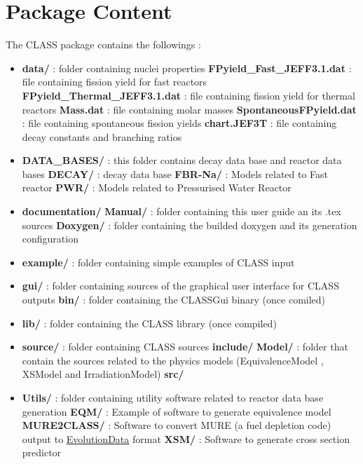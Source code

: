 \chapter{Package Content}
The CLASS package contains the followings :
\begin{itemize}
\item   \textbf{data/} : folder containing nuclei properties
\subitem \textbf{FPyield\_Fast\_JEFF3.1.dat }     : file containing fission yield for fast reactors
\subitem \textbf{FPyield\_Thermal\_JEFF3.1.dat}   : file containing fission yield for thermal reactors
\subitem \textbf{Mass.dat }                     : file containing molar masses
\subitem \textbf{SpontaneousFPyield.dat }       : file containing spontaneous fission yields
\subitem \textbf{chart.JEF3T}                   : file containing decay constants and branching ratios

 \item \textbf{DATA\_BASES/}  : this folder contains decay data base and reactor data bases
 \subitem \textbf{DECAY/}     : decay data base
 \subitem \textbf{FBR-Na/}    : Models related to Fast reactor
 \subitem \textbf{PWR/}       : Models related to Pressurised Water Reactor
 
 \item \textbf{documentation/} 
 \subitem \textbf{Manual/}    : folder containing this user guide an its .tex sources
 \subitem \textbf{Doxygen/}   : folder containing the builded doxygen and its generation configuration 

\item \textbf{example/} : folder containing simple examples of CLASS input

\item \textbf{gui/} : folder containing sources of the graphical user interface for CLASS outputs
 \subitem \textbf{bin/}    : folder containing the CLASSGui binary (once comiled)

\item \textbf{lib/} : folder containing the CLASS library (once compiled)
\item \textbf{source/} : folder containing CLASS sources
\subitem \textbf{include/}
\subitem \textbf{Model/} : folder that contain the sources related to the physics models (EquivalenceModel , XSModel and IrradiationModel)
\subitem \textbf{src/}
\item \textbf{Utils/} : folder containing utility software related to reactor data base generation
\subitem \textbf{EQM/} : Example of software to generate equivalence model
\subitem \textbf{MURE2CLASS/} : Software to convert MURE (a fuel depletion code)  output to \hyperref[sec:EvolutionData]{EvolutionData} format
\subitem \textbf{XSM/} : Software to generate cross section predictor
 
 
\end{itemize}

